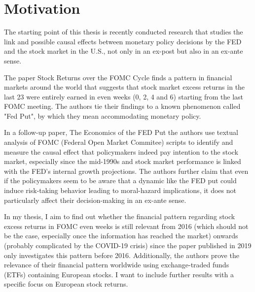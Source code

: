 
\chapter{Motivation}

The starting point of this thesis is recently conducted research that studies the link and possible causal effects between monetary policy decisions by the FED and the stock market in the U.S., not only in an ex-post but also in an ex-ante sense.

The paper Stock Returns over the FOMC Cycle \parencite{cieslak_stock_2019} finds a pattern in financial markets around the world that suggests that stock market excess returns in the last 23 were entirely earned in even weeks (0, 2, 4 and 6) starting from the last FOMC meeting. The authors tie their findings to a known phenomenon called "Fed Put", by which they mean accommodating monetary policy.

In a follow-up paper, The Economics of the FED Put \parencite{cieslak_economics_2021} the authors use textual analysis of FOMC (Federal Open Market Commitee) scripts to identify and measure the causal effect that policymakers indeed pay intention to the stock market, especially since the mid-1990s and stock market performance is linked with the FED’s internal growth projections. The authors further claim that even if the policymakers seem to be aware that a dynamic like the FED put could induce risk-taking behavior leading to moral-hazard implications, it does not particularly affect their decision-making in an ex-ante sense.

In my thesis, I aim to find out whether the financial pattern regarding stock excess returns in FOMC even weeks is still relevant from 2016 (which should not be the case, especially once the information has reached the market) onwards (probably complicated by the COVID-19 crisis) since the paper published in 2019 only investigates this pattern before 2016. Additionally, the authors prove the relevance of their financial pattern worldwide using exchange-traded funds (ETFs) containing European stocks. I want to include further results with a specific focus on European stock returns.


